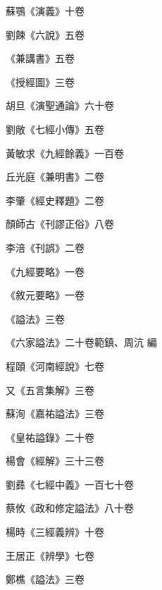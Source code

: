 \begin{pinyinscope}
 蘇鶚《演義》十卷



 劉餗《六說》五卷



 《兼講書》五卷



 《授經圖》三卷



 胡旦《演聖通論》六十卷



 劉敞《七經小傳》五卷



 黃敏求《九經餘義》一百卷



 丘光庭《兼明書》二卷



 李肇《經史釋題》二卷



 顏師古《刊謬正俗》八卷



 李涪《刊誤》二卷



 《九經要略》一卷



 《敘元要略》一卷



 《謚法》三卷



 《六家謚法》二十卷範鎮、周沆
 編



 程頤《河南經說》七卷



 又《五言集解》三卷



 蘇洵《嘉祐謚法》三卷



 《皇祐謚錄》二十卷



 楊會《經解》三十三卷



 劉彞《七經中義》一百七十卷



 蔡攸《政和修定謚法》八十卷



 楊時《三經義辨》十卷



 王居正《辨學》七卷



 鄭樵《謚法》三卷




\end{pinyinscope}
